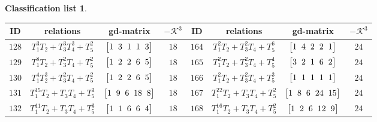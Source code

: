 \documentclass[10pt,a4paper]{amsart}
\theoremstyle{definition}
\newtheorem{class-list}[thm]{Classification list}
\numberwithin{equation}{section}
\begin{document}
\begin{class-list}
\begin{table}[t!]\centering\setlength{\tabcolsep}{3.5pt}
\renewcommand{\arraystretch}{1.25}\small\tabulinesep=1mm
\begin{tabu}{c|c|c|c||c|c|c|c}
\hline
ID&relations&gd-matrix&$-\mathcal{K}^3$&ID&relations&gd-matrix&$-\mathcal{K}^3$
\\
\hline
${128}$&${T_{1}^{3}T_{2}+T_{3}^{3}T_{4}^{3}+T_{5}^{2}}$
&$\arraycolsep=1mm\begin{bmatrix}{1} & {3} & {1} & {1} & {3}\end{bmatrix}$&${18}$
&${164}$&${T_{1}^{2}T_{2}+T_{3}^{2}T_{4}+T_{5}^{6}}$
&$\arraycolsep=1mm\begin{bmatrix}{1} & {4} & {2} & {2} & {1}\end{bmatrix}$&${24}$
\\
\hline
${129}$&${T_{1}^{8}T_{2}+T_{3}^{2}T_{4}+T_{5}^{2}}$
&$\arraycolsep=1mm\begin{bmatrix}{1} & {2} & {2} & {6} & {5}\end{bmatrix}$&${18}$
&${165}$&${T_{1}^{2}T_{2}+T_{3}^{2}T_{4}+T_{5}^{4}}$
&$\arraycolsep=1mm\begin{bmatrix}{3} & {2} & {1} & {6} & {2}\end{bmatrix}$&${24}$
\\
\hline
${130}$&${T_{1}^{4}T_{2}^{3}+T_{3}^{2}T_{4}+T_{5}^{2}}$
&$\arraycolsep=1mm\begin{bmatrix}{1} & {2} & {2} & {6} & {5}\end{bmatrix}$&${18}$
&${166}$&${T_{1}^{2}T_{2}+T_{3}^{2}T_{4}+T_{5}^{3}}$
&$\arraycolsep=1mm\begin{bmatrix}{1} & {1} & {1} & {1} & {1}\end{bmatrix}$&${24}$
\\
\hline
${131}$&${T_{1}^{15}T_{2}+T_{3}T_{4}+T_{5}^{3}}$
&$\arraycolsep=1mm\begin{bmatrix}{1} & {9} & {6} & {18} & {8}\end{bmatrix}$&${18}$
&${167}$&${T_{1}^{22}T_{2}+T_{3}T_{4}+T_{5}^{2}}$
&$\arraycolsep=1mm\begin{bmatrix}{1} & {8} & {6} & {24} & {15}\end{bmatrix}$&${24}$
\\
\hline
${132}$&${T_{1}^{11}T_{2}+T_{3}T_{4}+T_{5}^{3}}$
&$\arraycolsep=1mm\begin{bmatrix}{1} & {1} & {6} & {6} & {4}\end{bmatrix}$&${18}$
&${168}$&${T_{1}^{16}T_{2}+T_{3}T_{4}+T_{5}^{2}}$
&$\arraycolsep=1mm\begin{bmatrix}{1} & {2} & {6} & {12} & {9}\end{bmatrix}$&${24}$

\end{tabu}
\end{table}
\end{class-list}
\end{document}
